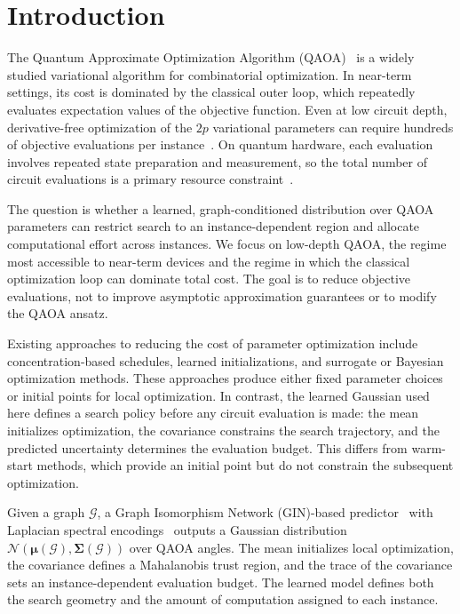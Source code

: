 \documentclass[aps,prx,reprint,superscriptaddress,longbibliography]{revtex4-2}
\newcommand{\QAOA}{\textnormal{\textsc{QAOA}}}
\newcommand{\GIN}{\textnormal{\textsc{GIN}}}
\newcommand{\Normal}{\mathcal{N}}
\newcommand{\calG}{\mathcal{G}}
\begin{document}
\maketitle

\section{Introduction}
\label{sec:intro}

The Quantum Approximate Optimization Algorithm (\QAOA)~\cite{farhi2014}
is a widely studied variational algorithm for combinatorial
optimization.
In near-term settings, its cost is dominated by the classical outer
loop, which repeatedly evaluates expectation values of the objective
function. Even at low circuit depth, derivative-free optimization of
the $2p$ variational parameters can require hundreds of objective
evaluations per instance~\cite{zhou2020,wurtz2021}. On quantum
hardware, each evaluation involves repeated state preparation and
measurement, so the total number of circuit evaluations is a primary
resource constraint~\cite{cerezo2021,preskill2018}.

The question is whether a learned, graph-conditioned distribution over
\QAOA{} parameters can restrict search to an instance-dependent region
and allocate computational effort across instances. We focus on
low-depth \QAOA{}, the regime most accessible to near-term devices and
the regime in which the classical optimization loop can dominate total
cost. The goal is to reduce objective evaluations, not to improve
asymptotic approximation guarantees or to modify the \QAOA{} ansatz.

Existing approaches to reducing the cost of parameter optimization
include concentration-based schedules, learned initializations, and
surrogate or Bayesian optimization methods. These approaches
produce either fixed parameter choices or initial points for local
optimization. In contrast, the learned Gaussian used here defines a
search policy before any circuit evaluation is made: the mean
initializes optimization, the covariance constrains the search
trajectory, and the predicted uncertainty determines the evaluation
budget. This differs from warm-start methods, which provide
an initial point but do not constrain the subsequent optimization.

Given a graph $\calG$, a Graph Isomorphism Network (\GIN{})-based predictor~\cite{xu2019} with
Laplacian spectral encodings~\cite{dwivedi2023,lim2023} outputs a
Gaussian distribution $\Normal(\bm\mu(\calG),\bm\Sigma(\calG))$ over
\QAOA{} angles. The mean initializes local optimization, the
covariance defines a Mahalanobis trust region, and the trace of the
covariance sets an instance-dependent evaluation budget. The learned
model defines both the search geometry and the amount of
computation assigned to each instance.
\end{document}
